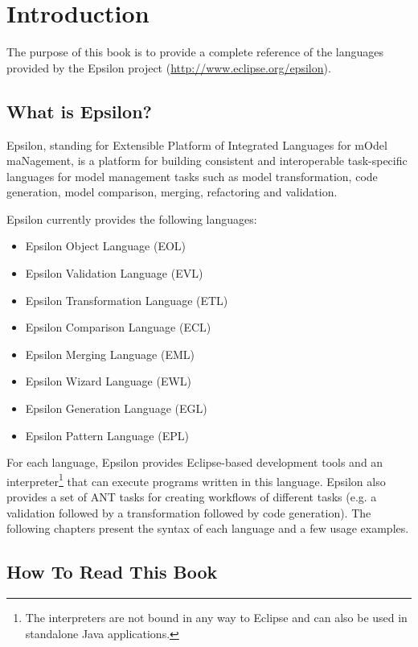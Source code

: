 \chapter{Introduction}
\label{chp:Introduction}

The purpose of this book is to provide a complete reference of the languages provided by the Epsilon project (\url{http://www.eclipse.org/epsilon}).

\section{What is Epsilon?}

Epsilon, standing for Extensible Platform of Integrated Languages for mOdel maNagement, is a platform for building consistent and interoperable task-specific languages for model management tasks such as model transformation, code generation, model comparison, merging, refactoring and validation.

Epsilon currently provides the following languages:

\begin{itemize}
	\item Epsilon Object Language (EOL)
	\item Epsilon Validation Language (EVL)
	\item Epsilon Transformation Language (ETL)
	\item Epsilon Comparison Language (ECL)
	\item Epsilon Merging Language (EML)
	\item Epsilon Wizard Language (EWL)
	\item Epsilon Generation Language (EGL)
	\item Epsilon Pattern Language (EPL)
\end{itemize}

For each language, Epsilon provides Eclipse-based development tools and an interpreter\footnote{The interpreters are not bound in any way to Eclipse and can also be used in standalone Java applications.} that can execute programs written in this language. Epsilon also provides a set of ANT tasks for creating workflows of different tasks (e.g. a validation followed by a transformation followed by code generation). The following chapters present the syntax of each language and a few usage examples.

\section{How To Read This Book}

